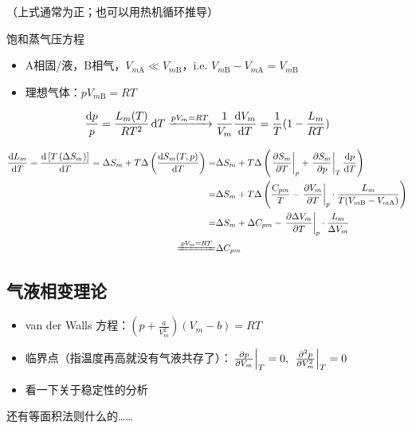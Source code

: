 （上式通常为正；也可以用热机循环推导）

饱和蒸气压方程
\begin{itemize}
    \item A相固/液，B相气，$V_{m\text{A}} \ll V_{m\text{B}}$，i.e. $V_{m\text{B}} - V_{m\text{A}} = V_{m\text{B}}$
    \item 理想气体：$p V_{m\text{B}} = R T$
\end{itemize}

\[
\frac{\dd{p}}{p} = \frac{L_m(T)}{R T^2} \dd{T} \xrightarrow{p V_m = R T} \frac{1}{V_m} \dv{V_m}{T} = \frac{1}{T} (1 - \frac{L_m}{R T})
\]

\begin{align*}
    \dv{L_m}{T} = \dv{\left[T \left(\Delta S_m\right)\right]}{T} = \Delta S_m + T \Delta \left(\dv{S_m(T, p)}{T}\right) = & \Delta S_m + T \Delta \left(\left.\pdv{S_m}{T}\right|_p + \left.\pdv{S_m}{p}\right|_T \dv{p}{T}\right)\\
    = & \Delta S_m + T \Delta \left(\frac{C_{pm}}{T} - \left.\pdv{V_m}{T}\right|_p \cdot \frac{L_m}{T (V_{m \text{B}} - V_{m \text{A}})}\right)\\
    = & \Delta S_m + \Delta C_{pm} - \left.\pdv{\Delta V_m}{T}\right|_p \cdot \frac{L_m}{\Delta V_m}\\
    \xlongequal{p V_m = R T} & \Delta C_{pm}
\end{align*}

\subsection{气液相变理论}

\begin{itemize}
    \item van der Walls 方程：$\left(p + \frac{a}{V_m^2}\right) \left(V_m - b\right) = R T$
    \item 临界点（指温度再高就没有气液共存了）：$\left.\pdv{p}{V_m}\right|_T = 0,\ \left.\pdv[2]{p}{V_m}\right|_T = 0$
    \item 看一下关于稳定性的分析
\end{itemize}

还有等面积法则什么的……